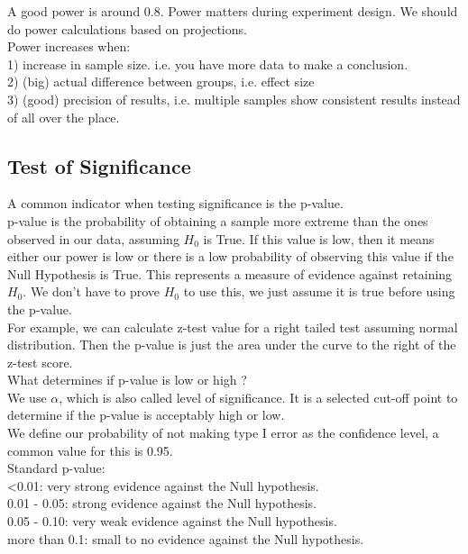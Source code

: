 A good power is around 0.8. Power matters during experiment design. We should do power calculations based on projections.\\

Power increases when:\\
1) increase in sample size. i.e. you have more data to make a conclusion.\\
2) (big) actual difference between groups, i.e. effect size\\
3) (good) precision of results, i.e. multiple samples show consistent results instead of all over the place.\\

\subsection{Test of Significance}

A common indicator when testing significance is the p-value. \\

p-value is the probability of obtaining a sample more extreme than the ones observed in our data, assuming $H_0$ is True. If this value is low, then it means either our power is low or there is a low probability of observing this value if the Null Hypothesis is True. This represents a measure of evidence against retaining $H_0$. We don't have to prove $H_0$ to use this, we just assume it is true before using the p-value.\\

For example, we can calculate z-test value for a right tailed test assuming normal distribution. Then the p-value is just the area under the curve to the right of the z-test score.   \\

What determines if p-value is low or high ?\\
We use $\alpha$, which is also called level of significance. It is a selected cut-off point to determine if the p-value is acceptably high or low.\\

We define our probability of not making type I error as the confidence level, a common value for this is 0.95.\\

Standard p-value:\\
<0.01: very strong evidence against the Null hypothesis.\\
0.01 - 0.05: strong evidence against the Null hypothesis.\\
0.05 - 0.10: very weak evidence against the Null hypothesis. \\
more than 0.1: small to no evidence against the Null hypothesis. \\


